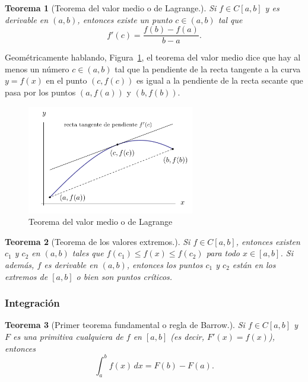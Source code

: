 \documentclass[12pt]{article}
\newtheorem{Teo}{Teorema}
\begin{document}
\begin{Teo}[Teorema del valor medio o de Lagrange.]
Si $f\in C[a, b]$ y es derivable en $(a,b)$, entonces existe un punto $c\in (a,b)$ tal que
$$f'(c) = \frac{f(b) - f(a)}{b - a}.$$
\end{Teo}

Geométricamente hablando, Figura~\ref{fig:lagrange}, el teorema del valor medio dice que hay al menos un número $c \in (a, b) $ tal que la pendiente de la recta tangente a la curva $y = f(x) $ en el punto $(c, f(c)) $ es igual a la pendiente de la recta secante que pasa por los puntos $(a, f(a)) $ y $(b, f(b)) $.

\begin{figure}[H]
\centering
\includegraphics[width=0.65\textwidth]{Fig3.png}
\caption{Teorema del valor medio o de Lagrange}
\label{fig:lagrange}
\end{figure}

\begin{Teo}[Teorema de los valores extremos.]  
Si $f \in C[a,b] $, entonces existen $c_1 $ y $c_2 $ en $(a,b) $ tales que $f(c_1) \leq f(x) \leq f(c_2) $ para todo $x \in [a,b] $. Si además, $f $ es derivable en $(a,b) $, entonces los puntos $c_1 $ y $c_2 $ están en los extremos de $[a,b] $ o bien son puntos críticos.
\end{Teo}

\subsubsection{Integración}

\begin{Teo}[Primer teorema fundamental o regla de Barrow.]
  Si $f \in C[a, b] $ y $F $ es una primitiva cualquiera de $f $ en $[a, b] $ (es decir, $F'(x) = f(x) $), entonces $$\int_a^b f(x) \, dx = F(b) - F(a). $$
\end{Teo}
\end{document}
